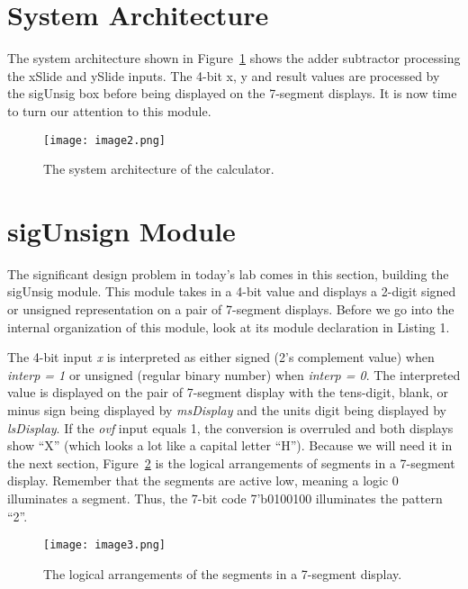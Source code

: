 \hypertarget{system-architecture}{%
\section{System Architecture}\label{system-architecture}}

The system architecture shown in Figure~\ref{fig:sysArchCalc} shows the adder subtractor
processing the xSlide and ySlide inputs. The 4-bit x, y and result
values are processed by the sigUnsig box before being displayed on the
7-segment displays. It is now time to turn our attention to this module.

\begin{figure}[ht]
\texttt{[image:  image2.png]}
\caption{The system architecture of the calculator.}
\label{fig:sysArchCalc}
\end{figure}

\hypertarget{sigunsign-module}{%
\section{sigUnsign Module}\label{sigunsign-module}}

The significant design problem in today's lab comes in this section,
building the sigUnsig module. This module takes in a 4-bit value and
displays a 2-digit signed or unsigned representation on a pair of
7-segment displays. Before we go into the internal organization of this
module, look at its module declaration in Listing 1.

The 4-bit input \emph{x} is interpreted as either signed (2's complement
value) when \emph{interp = 1} or unsigned (regular binary number) when
\emph{interp = 0}. The interpreted value is displayed on the pair of
7-segment display with the tens-digit, blank, or minus sign being
displayed by \emph{msDisplay} and the units digit being displayed by
\emph{lsDisplay}. If the \emph{ovf} input equals 1, the conversion is
overruled and both displays show ``X'' (which looks a lot like a capital
letter ``H''). Because we will need it in the next section, Figure~\ref{fig:calcSevenSeg} is
the logical arrangements of segments in a 7-segment display. Remember
that the segments are active low, meaning a logic 0 illuminates a
segment. Thus, the 7-bit code 7'b0100100 illuminates the pattern ``2''.

\begin{figure}[ht]
\texttt{[image:  image3.png]}
\caption{The logical arrangements of the segments in a 7-segment display.}
\label{fig:calcSevenSeg}
\end{figure}

